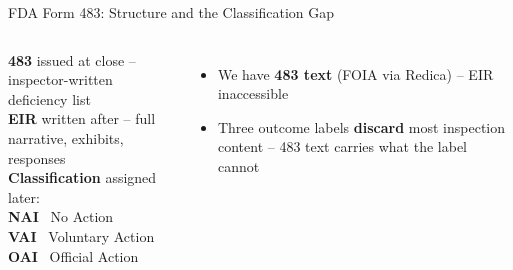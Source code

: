 \documentclass[aspectratio=169,10pt]{beamer}
\begin{document}
\begin{frame}{FDA Form 483: Structure and the Classification Gap}
\begin{columns}[T]

{\small
\textbf{483} issued at close -- inspector-written deficiency list\\[5pt]
\textbf{EIR} written after -- full narrative, exhibits, responses\\[5pt]
\textbf{Classification} assigned later:\\[4pt]
\quad \textcolor{govGreen}{\textbf{NAI}} ~\textcolor{ncsuGray}{\small No Action}\\
\quad \textcolor{warnOrange}{\textbf{VAI}} ~\textcolor{ncsuGray}{\small Voluntary Action}\\
\quad \textcolor{ncsuRed}{\textbf{OAI}} ~\textcolor{ncsuGray}{\small Official Action}
}

\vspace{8pt}
\begin{itemize}
  \setlength{\itemsep}{6pt}
  \item<2-> We have \textbf{483 text} (FOIA via Redica) -- EIR inaccessible
  \item<3-> Three outcome labels \textbf{discard} most inspection content -- 483 text carries what the label cannot
\end{itemize}


\end{columns}
\end{frame}
\end{document}

